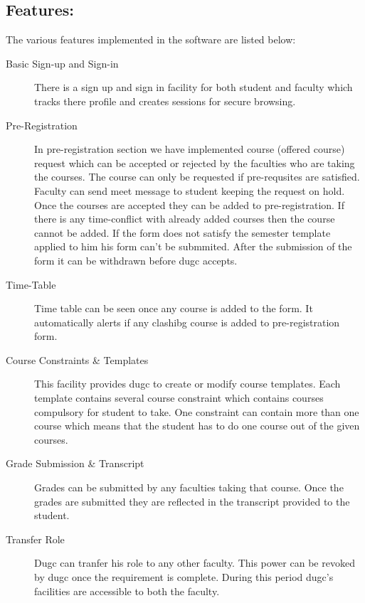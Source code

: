 \documentclass[12pt]{article}
\begin{document}
\subsection{Features:}
The various features implemented in the software are listed below:
\begin{description}
\item[Basic Sign-up and Sign-in]
There is a sign up and sign in facility for both student and faculty which
tracks there profile and creates sessions for secure browsing.
\item[Pre-Registration]
 In pre-registration section we have implemented course (offered course) request
 which can be accepted or rejected by the faculties who are taking the courses.
 The course can only be requested if pre-requsites are satisfied. Faculty can send
 meet message to student keeping the request on hold.
 Once the courses are accepted they can be added to pre-registration. If there is any
 time-conflict with already added courses then the course cannot be added.
 If the form does not satisfy the semester template applied to him his form can't be submmited.
 After the submission of the form it can be withdrawn before dugc accepts.
 \item[Time-Table]
 Time table can be seen once any course is added to the form. It automatically alerts if any
 clashibg course is added to pre-registration form.
 \item[Course Constraints \& Templates]
 This facility provides dugc to create or modify course templates. Each template contains
 several course constraint which contains courses compulsory for student to take. One constraint
 can contain more than one course which means that the student has to do one course out of the given courses.
 \item[Grade Submission \& Transcript]
 Grades can be submitted by any faculties taking that
 course. Once the grades are submitted they are reflected in the transcript provided to the student.
 \item[Transfer Role]
Dugc can tranfer his role to any other faculty. This power can be revoked by dugc once the requirement
is complete. During this period dugc's facilities are accessible to both the faculty.
\end{description}
\end{document}
